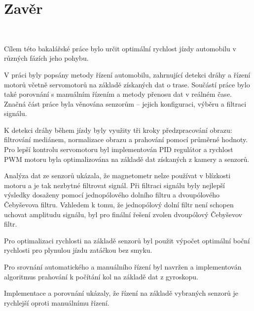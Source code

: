 \chapter{Zavěr}
\label{sec:End}
\vspace{-20pt}
\

Cílem této bakalářské práce bylo určit optimální rychlost jízdy automobilu v různých fázích jeho pohybu.

V práci byly popsány metody řízení automobilu, zahrnující detekci dráhy a řízení motorů včetně 
servomotorů na základě získaných dat o trase. Součástí práce bylo také porovnání s manuálním řízením a 
metody přenosu dat v reálném čase. Značná část práce byla věnována senzorům – jejich konfiguraci, výběru 
a filtraci signálu.

K detekci dráhy během jízdy byly využity tři kroky předzpracování obrazu: filtrování mediánem, 
normalizace obrazu a prahování pomocí průměrné hodnoty. Pro lepší kontrolu servomotoru byl implementován 
PID regulátor a rychlost PWM motoru byla optimalizována na základě dat získaných z kamery a senzorů.

Analýza dat ze senzorů ukázala, že magnetometr nelze používat v blízkosti motoru a je tak nezbytné filtrovat 
signál. Při filtraci signálu byly nejlepší výsledky dosaženy pomocí jednopólového dolního filtru a 
dvoupólového Čebyševova filtru. Vzhledem k tomu, že jednopólový dolní filtr není schopen uchovat 
amplitudu signálu, byl pro finální řešení zvolen dvoupólový Čebyševov filtr.

Pro optimalizaci rychlosti na základě senzorů byl použit výpočet optimální boční rychlosti pro plynulou 
jízdu zatáčkou bez smyku.

Pro srovnání automatického a manuálního řízení byl navržen a implementován algoritmus prahování 
k počítání kol na základě dat z gyroskopu.

Implementace a porovnání ukázaly, že řízení na základě vybraných senzorů je rychlejší oproti manuálnímu 
řízení.

\endinput
